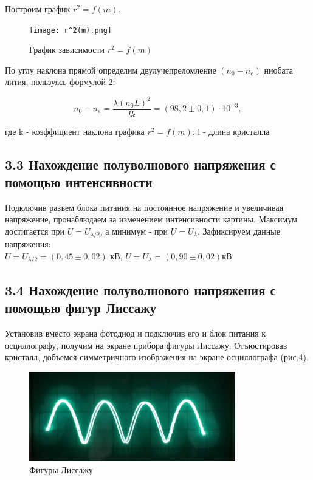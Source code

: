 \documentclass[a4paper,12pt]{report}
\begin{document}
Построим график $r^2 = f(m)$. 

\begin{figure}[H]
\texttt{[image: r^2(m).png]}
\centering
\caption{График зависимости $r^2 = f(m)$}
\end{figure}


По углу наклона прямой определим двулучепреломление $(n_0 - n_e)$ ниобата лития, пользуясь формулой 2:

\begin{equation}
n_0 - n_e = \frac{\lambda (n_0 L)^2}{lk} = (98,2 \pm 0,1) \cdot 10^{-3},
\end{equation}

где k - коэффициент наклона графика $r^2 = f(m)$, l - длина кристалла

\subsection*{3.3 Нахождение полуволнового напряжения с помощью интенсивности }

Подключив разъем блока питания на постоянное напряжение и увеличивая напряжение, пронаблюдаем за изменением интенсивности картины. Максимум достигается при $U = U_{\lambda/2}$, а минимум - при $U = U_{\lambda}$.
Зафиксируем данные напряжения: \\
$U = U_{\lambda/2} = (0,45\pm 0,02)$ кВ, $U = U_{\lambda} = (0,90\pm 0,02)$кВ

\subsection*{3.4 Нахождение полуволнового напряжения с помощью фигур Лиссажу}

Установив вместо экрана фотодиод и подключив его и блок питания к осциллографу, получим на экране прибора фигуры Лиссажу. Отъюстировав кристалл, добъемся симметричного изображения на экране осциллографа (рис.4).

\begin{figure}[H]
\includegraphics[width = 0.8\textwidth]{осциллограф.jpg}
\centering
\caption{Фигуры Лиссажу}
\end{figure}
\end{document}
